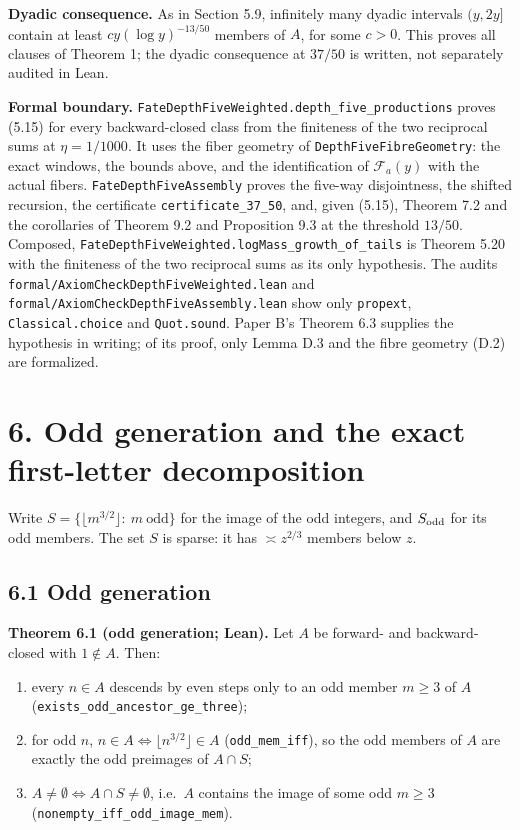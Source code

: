 \documentclass[11pt,a4paper]{article}
\providecommand{\tightlist}{\setlength{\itemsep}{0pt}\setlength{\parskip}{0pt}}
\begin{document}
\textbf{Dyadic consequence.} As in Section 5.9, infinitely many dyadic
intervals \((y,2y]\) contain at least \(cy(\log y)^{-13/50}\) members of
\(A\), for some \(c>0\). This proves all clauses of Theorem 1; the
dyadic consequence at \(37/50\) is written, not separately audited in
Lean.

\textbf{Formal boundary.}
\texttt{\nolinkurl{FateDepthFiveWeighted.depth_five_productions}} proves
(5.15) for every backward-closed class from the finiteness of the two
reciprocal sums at \(\eta=1/1000\). It uses the fiber geometry of
\texttt{\nolinkurl{DepthFiveFibreGeometry}}: the exact windows, the
bounds above, and the identification of \(\mathcal F_a(y)\) with the
actual fibers. \texttt{\nolinkurl{FateDepthFiveAssembly}} proves the
five-way disjointness, the shifted recursion, the certificate
\texttt{\nolinkurl{certificate_37_50}}, and, given (5.15), Theorem 7.2
and the corollaries of Theorem 9.2 and Proposition 9.3 at the threshold
\(13/50\). Composed,
\texttt{\nolinkurl{FateDepthFiveWeighted.logMass_growth_of_tails}} is
Theorem 5.20 with the finiteness of the two reciprocal sums as its only
hypothesis. The audits
\texttt{\nolinkurl{formal/AxiomCheckDepthFiveWeighted.lean}} and
\texttt{\nolinkurl{formal/AxiomCheckDepthFiveAssembly.lean}} show only
\texttt{\nolinkurl{propext}}, \texttt{\nolinkurl{Classical.choice}} and
\texttt{\nolinkurl{Quot.sound}}. Paper B's Theorem 6.3 supplies the
hypothesis in writing; of its proof, only Lemma D.3 and the fibre
geometry (D.2) are formalized.

\section{6. Odd generation and the exact first-letter
decomposition}\label{odd-generation-and-the-exact-first-letter-decomposition}

Write \(S=\{\lfloor m^{3/2}\rfloor:\ m\ \text{odd}\}\) for the image of
the odd integers, and \(S_{\rm odd}\) for its odd members. The set \(S\)
is sparse: it has \(\asymp z^{2/3}\) members below \(z\).

\subsection{6.1 Odd generation}\label{odd-generation}

\textbf{Theorem 6.1 (odd generation; Lean).} Let \(A\) be forward- and
backward-closed with \(1\notin A\). Then:

\begin{enumerate}
\def\labelenumi{\arabic{enumi}.}
\tightlist
\item
  every \(n\in A\) descends by even steps only to an odd member
  \(m\ge 3\) of \(A\)
  (\texttt{\nolinkurl{exists_odd_ancestor_ge_three}});
\item
  for odd \(n\), \(n\in A\iff\lfloor n^{3/2}\rfloor\in A\)
  (\texttt{\nolinkurl{odd_mem_iff}}), so the odd members of \(A\) are
  exactly the odd preimages of \(A\cap S\);
\item
  \(A\ne\emptyset\iff A\cap S\ne\emptyset\), i.e.~\(A\) contains the
  image of some odd \(m\ge 3\)
  (\texttt{\nolinkurl{nonempty_iff_odd_image_mem}}).
\end{enumerate}
\end{document}
